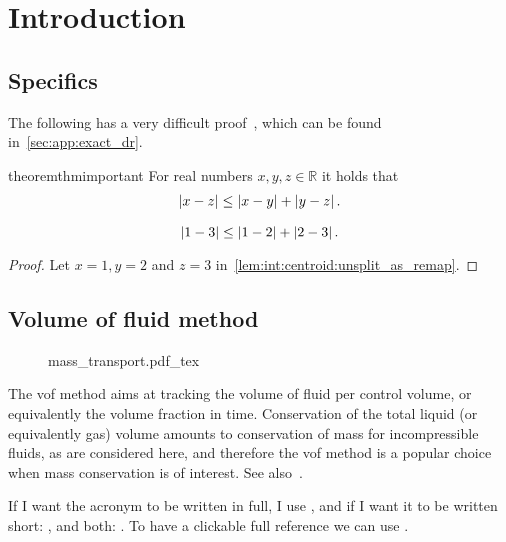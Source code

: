 \section{Introduction}
\lipsum[5]

\subsection{Specifics}
The following has a very difficult proof~\citep*{lagree2011granular_custom}, which can be found in~\cref{sec:app:exact_dr}.
\begin{restatable}{theorem}{thmimportant}\label{lem:int:centroid:unsplit_as_remap}
  For real numbers $x, y, z \in \mathbb{R}$ it holds that
  \begin{eqnarray}
    \left\lvert x - z \right\rvert \le \left\lvert x - y \right\rvert + \left\lvert y - z \right\rvert.
  \end{eqnarray}
\end{restatable}


\begin{corollary}
  \begin{equation}
    \left\lvert 1 -3 \right\rvert \le \left\lvert 1 - 2 \right\rvert + \left\lvert 2 - 3 \right\rvert.
  \end{equation}  
\end{corollary}
\begin{proof}
  Let $x = 1, y = 2$ and $z = 3$ in~\cref{lem:int:centroid:unsplit_as_remap}.
\end{proof}

\subsection{Volume of fluid method}
\begin{figure}
  \centering
  {mass_transport.pdf_tex}
  \caption{\lipsum[6]}
  \label{fig:interface:mass_transport}
\end{figure}
The \gls{vof} method aims at tracking the volume of fluid per control volume, or equivalently the volume fraction in time.
Conservation of the total liquid (or equivalently gas) volume amounts to conservation of mass for incompressible fluids, as are considered here, and therefore the \gls{vof} method is a popular choice when mass conservation is of interest.
See also~\citet{Basilisk,IMO2020}.

If I want the acronym to be written in full, I use , and if I want it to be written short: , and both: .
To have a clickable full reference we can use .

